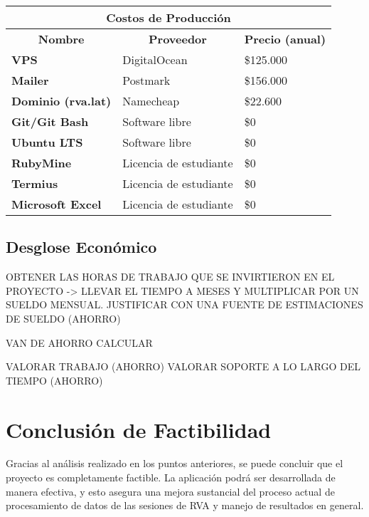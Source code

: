 \begin{center}
	\begin{tabular}{ | l | p{5cm} | p{5cm}|}
		\hline
		\multicolumn{3}{|c|}{\textbf{Costos de Producción}} \\
		\hline
		\multicolumn{1}{|c|}{\textbf{Nombre}} & \multicolumn{1}{|c|}{\textbf{Proveedor}} & \multicolumn{1}{|c|}{\textbf{Precio (anual)}} \\
		\hline
		{\textbf{VPS}} & DigitalOcean & \$125.000 \\ \hline
		
		{\textbf{Mailer}} & Postmark & \$156.000 \\ \hline
		
		{\textbf{Dominio (rva.lat)}} & Namecheap & \$22.600 \\ \hline
		
		{\textbf{Git/Git Bash}} & Software libre & \$0 \\ \hline
		
		{\textbf{Ubuntu LTS}} & Software libre & \$0 \\ \hline
		
		{\textbf{RubyMine}} & Licencia de estudiante & \$0 \\ \hline
		
		{\textbf{Termius}} & Licencia de estudiante & \$0 \\ \hline
		
		{\textbf{Microsoft Excel}} & Licencia de estudiante & \$0 \\ \hline
	\end{tabular}
\end{center}

\subsection{Desglose Económico}

OBTENER LAS HORAS DE TRABAJO QUE SE INVIRTIERON EN EL PROYECTO -> LLEVAR EL TIEMPO A MESES Y MULTIPLICAR POR UN SUELDO MENSUAL. JUSTIFICAR CON UNA FUENTE DE ESTIMACIONES DE SUELDO (AHORRO)

VAN DE AHORRO CALCULAR

VALORAR TRABAJO (AHORRO)
VALORAR SOPORTE A LO LARGO DEL TIEMPO (AHORRO)

\section{Conclusión de Factibilidad}
Gracias al análisis realizado en los puntos anteriores, se puede concluir que el proyecto es completamente factible. La aplicación podrá ser desarrollada de manera efectiva, y esto asegura una mejora sustancial del proceso actual de procesamiento de datos de las sesiones de RVA y manejo de resultados en general.
